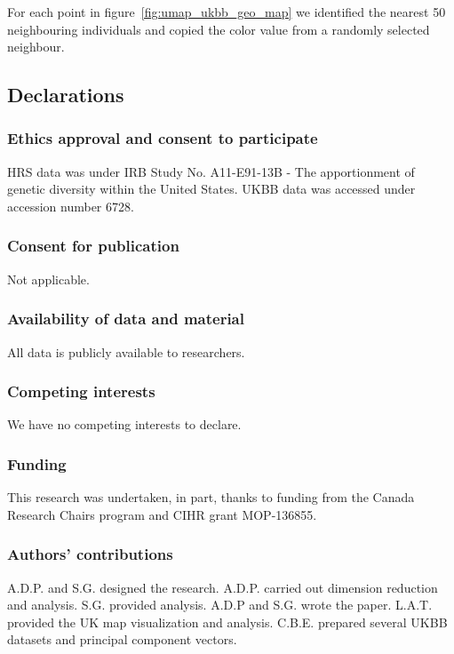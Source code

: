 \documentclass[12pt]{pnas-new}
\begin{document}
{For each point in figure~\ref{fig:umap_ukbb_geo_map} we identified the nearest 50 neighbouring individuals and copied the color value from a randomly selected neighbour.}

\showmatmethods{} %



\subsection*{Declarations}
\subsubsection*{Ethics approval and consent to participate}
HRS data was under IRB Study No. A11-E91-13B - The apportionment of genetic diversity within the United States. UKBB data was accessed under accession number 6728.

\subsubsection*{Consent for publication} Not applicable.

\subsubsection*{Availability of data and material} All data is publicly available to researchers.

\subsubsection*{Competing interests}
We have no competing interests to declare.

\subsubsection*{Funding}
This research was undertaken, in part, thanks to funding from the Canada Research Chairs program and CIHR grant MOP-136855.

\subsubsection*{Authors' contributions}
A.D.P. and S.G. designed the research. A.D.P. carried out dimension reduction and analysis. S.G. provided analysis. A.D.P and S.G. wrote the paper. L.A.T. provided the UK map visualization and analysis. C.B.E. prepared several UKBB datasets and principal component vectors.
\end{document}
